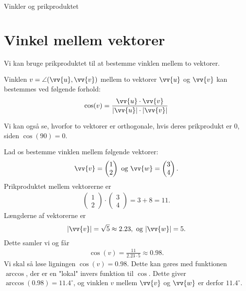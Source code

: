 \begin{center}
\Huge
Vinkler og prikproduktet
\end{center}

\section*{Vinkel mellem vektorer}

Vi kan bruge prikproduktet til at bestemme vinklen mellem to vektorer.
\begin{setn}\label{setn:1}
Vinklen $v = \angle (\vv{u},\vv{v})$ mellem to vektorer $\vv{u}$ og $\vv{v}$ kan bestemmes ved følgende forhold:
\begin{align*}
\cos(v) = \frac{\vv{u}\cdot \vv{v}}{|\vv{u}|\cdot |\vv{v}|}
\end{align*}
\end{setn}

Vi kan også se, hvorfor to vektorer er orthogonale, hvis deres prikprodukt er $0$, siden $\cos(90) = 0$.
\begin{exa}
Lad os bestemme vinklen mellem følgende vektorer:
\begin{align*}
\vv{v} = \begin{pmatrix}
1\\ 2
\end{pmatrix}\textnormal{ og }\vv{w}=\begin{pmatrix}
3\\ 4
\end{pmatrix}.
\end{align*}
Prikproduktet mellem vektorerne er 
\begin{align*}
\begin{pmatrix}
1\\ 2
\end{pmatrix} \cdot \begin{pmatrix}
3\\ 4
\end{pmatrix} = 3+8 = 11.
\end{align*}
Længderne af vektorerne er
\begin{align*}
|\vv{v}| = \sqrt{5} \approx 2.23, \textnormal{ og } |\vv{w}| = 5.
\end{align*}
Dette samler vi og får
\begin{align*}
\cos(v) = \frac{11}{2.23\cdot 5} \approx 0.98.
\end{align*}
Vi skal så løse ligningen $\cos(v) = 0.98$. Dette kan gøres med funktionen $\arccos$, der er en "lokal" invers funktion til $\cos$. Dette giver $\arccos(0.98) = 11.4^{\circ}$, og vinklen $v$ mellem $\vv{v}$ og $\vv{w}$ er derfor $11.4^\circ.$
\end{exa}

